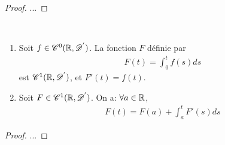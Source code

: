 \documentclass[french,a4paper,10pt]{article}
\begin{document}
            \begin{proof}
                ...
            \end{proof}

            \begin{theorem}\  \label{thm:2.2.10}
                \begin{enumerate}
                    \item Soit $f \in \mathscr{C}^0(\mathbb{R},\mathscr{D^{'}})$. La fonction $F$ définie par
                        \begin{equation*}
                            \begin{aligned}
                                F(t) = \int_0^t f(s)ds
                            \end{aligned}
                        \end{equation*}
                        est $\mathscr{C}^1(\mathbb{R},\mathscr{D^{'}})$, et $F'(t)=f(t)$.

                    \item Soit $F\in\mathscr{C}^1(\mathbb{R},\mathscr{D^{'}})$. On a: $\forall a \in \mathbb{R}$,
                        \begin{equation*}
                            \begin{aligned}
                                F(t) = F(a) + \int_a^t F'(s)ds
                            \end{aligned}
                        \end{equation*}
                \end{enumerate}
            \end{theorem}

            \begin{proof}
                ...
            \end{proof}
\end{document}
